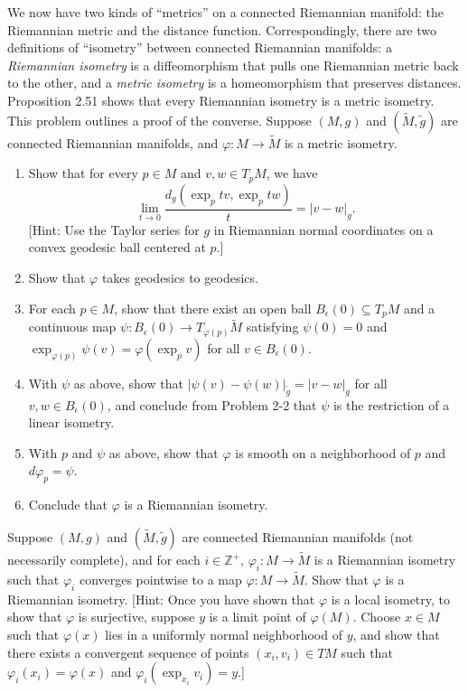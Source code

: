 \begin{exercise}
\label{prob:metric-isometry-characterization}
\label{prob:exponential-distance-limit}

We now have two kinds of ``metrics'' on a connected Riemannian manifold: the Riemannian metric and the distance function. Correspondingly, there are two definitions of ``isometry'' between connected Riemannian manifolds: a \emph{Riemannian isometry} is a diffeomorphism that pulls one Riemannian metric back to the other, and a \emph{metric isometry} is a homeomorphism that preserves distances. Proposition 2.51 shows that every Riemannian isometry is a metric isometry. This problem outlines a proof of the converse. Suppose $(M, g)$ and $(\tilde{M}, \tilde{g})$ are connected Riemannian manifolds, and $\varphi: M \to \tilde{M}$ is a metric isometry.
\begin{enumerate}
\item[(a)] Show that for every $p \in M$ and $v, w \in T_p M$, we have
\[
\lim_{t \to 0} \frac{d_g(\exp_p tv, \exp_p tw)}{t} = |v - w|_g.
\]
[Hint: Use the Taylor series for $g$ in Riemannian normal coordinates on a convex geodesic ball centered at $p$.]
\item[(b)] Show that $\varphi$ takes geodesics to geodesics.
\item[(c)] For each $p \in M$, show that there exist an open ball $B_\epsilon(0) \subseteq T_p M$ and a continuous map $\psi : B_\epsilon(0) \to T_{\varphi(p)} \tilde{M}$ satisfying $\psi(0) = 0$ and $\exp_{\varphi(p)} \psi(v) = \varphi(\exp_p v)$ for all $v \in B_\epsilon(0)$.
\item[(d)] With $\psi$ as above, show that $|\psi(v) - \psi(w)|_{\tilde{g}} = |v - w|_g$ for all $v, w \in B_\epsilon(0)$, and conclude from Problem 2-2 that $\psi$ is the restriction of a linear isometry.
\item[(e)] With $p$ and $\psi$ as above, show that $\varphi$ is smooth on a neighborhood of $p$ and $d\varphi_p = \psi$.
\item[(f)] Conclude that $\varphi$ is a Riemannian isometry.
\end{enumerate}
\end{exercise}

\begin{exercise}
\label{prob:limit-isometry}

Suppose $(M, g)$ and $(\tilde{M}, \tilde{g})$ are connected Riemannian manifolds (not necessarily complete), and for each $i \in \mathbb{Z}^+$, $\varphi_i : M \to \tilde{M}$ is a Riemannian isometry such that $\varphi_i$ converges pointwise to a map $\varphi : M \to \tilde{M}$. Show that $\varphi$ is a Riemannian isometry. [Hint: Once you have shown that $\varphi$ is a local isometry, to show that $\varphi$ is surjective, suppose $y$ is a limit point of $\varphi(M)$. Choose $x \in M$ such that $\varphi(x)$ lies in a uniformly normal neighborhood of $y$, and show that there exists a convergent sequence of points $(x_i, v_i) \in TM$ such that $\varphi_i(x_i) = \varphi(x)$ and $\varphi_i(\exp_{x_i} v_i) = y$.]
\end{exercise}

